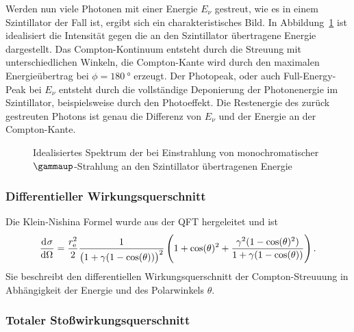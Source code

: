 \documentclass[11pt, ngerman, fleqn, DIV=15, headinclude, BCOR=2cm]{scrreprt}
\begin{document}
Werden nun viele Photonen mit einer Energie $E_\nu$ gestreut, wie es in einem
Szintillator der Fall ist, ergibt sich ein charakteristisches Bild. In
Abbildung~\ref{fig:Compton} ist idealisiert die Intensität gegen die an den
Szintillator übertragene Energie dargestellt. Das Compton-Kontinuum entsteht
durch die Streuung mit unterschiedlichen Winkeln, die Compton-Kante wird durch
den maximalen Energieübertrag bei $\phi = \SI{180}{\degree}$ erzeugt. Der
Photopeak, oder auch Full-Energy-Peak bei $E_\nu$ entsteht durch die
vollständige Deponierung der Photonenergie im Szintillator, beispielsweise
durch den Photoeffekt. Die Restenergie des zurück gestreuten Photons ist genau
die Differenz von $E_\nu$ und der Energie an der Compton-Kante.

\begin{figure}[htbp]
    \centering
    \caption{%
        Idealisiertes Spektrum der bei Einstrahlung von monochromatischer
        $\gammaup$-Strahlung an den Szintillator übertragenen Energie
    }
    \label{fig:Compton}
\end{figure}

\subsubsection{Differentieller Wirkungsquerschnitt}

Die Klein-Nishina Formel wurde aus der QFT hergeleitet und ist
\parencite[(2.107)]{Leo/Techniques_Nuclear_Experiments}
\[
    \dod\sigma\Omega =
    \frac{r_\text e^2}2 \frac1{\del{1 + \gamma(1 - \cos(\theta))}^2}
    \del{
        1 + \cos(\theta)^2 + \frac{\gamma^2(1 - \cos(\theta)^2)}{1 + \gamma(1 -
        \cos(\theta))}
    }.
\]
Sie beschreibt den differentiellen Wirkungsquerschnitt der Compton-Streuuung in
Abhängigkeit der Energie und des
Polarwinkels $\theta$.

\subsubsection{Totaler Stoßwirkungsquerschnitt}
\end{document}
